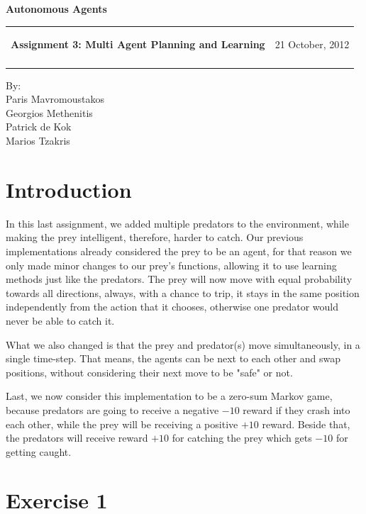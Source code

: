 \documentclass[a4paper,11pt]{article}
\makeatletter
\newcommand{\resheading}[1]{{\large \colorbox{mygrey}{\begin{minipage}{\textwidth}{\textbf{#1 \vphantom{p\^{E}}}}\end{minipage}}}}
\newcommand{\mywebheader}{
  \begin{tabular}{@{}p{5in}p{4in}}
  {\resheading{Assignment 3: Multi Agent Planning and Learning}} & {\Large 21 October, 2012}\\\vspace{0.2cm}
  \end{tabular}}
\makeatother
\begin{document}
\begin{center}
{\LARGE \textbf{Autonomous Agents}}\\ [1em]
\end{center}
\mywebheader

\begin{center}
{\Large By:} \\ \vspace{0.1cm}
{\Large Paris Mavromoustakos} \\  \vspace{0.1cm}
{\Large Georgios Methenitis} \\ \vspace{0.1cm}
{\Large Patrick de Kok} \\ \vspace{0.1cm}
{\Large Marios Tzakris}
\end{center}


\section{Introduction}

In this last assignment, we added multiple predators to the environment, while making the prey intelligent, therefore, harder to catch. Our previous implementations already considered the prey to be an agent, for that reason we only made minor changes to our prey's functions, allowing it to use learning methods just like the predators. The prey will now move with equal probability towards all directions, always, with a chance to trip, it stays in the same position independently from the action that it chooses, otherwise one predator would never be able to catch it.

What we also changed is that the prey and predator(s) move simultaneously, in a single time-step. That means, the agents can be next to each other and swap positions, without considering their next move to be "safe" or not.

Last, we now consider this implementation to be a zero-sum Markov game, because predators are going to receive a negative $-10$ reward if they crash into each other, while the prey will be receiving a positive $+10$ reward. Beside that, the predators will receive reward $+10$ for catching the prey which gets $-10$ for getting caught.



\section{Exercise 1}
\end{document}
